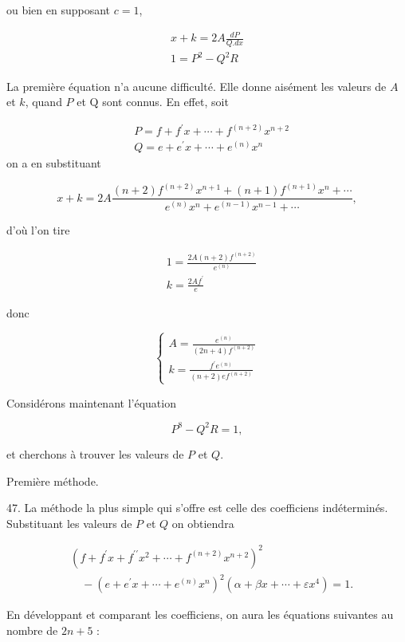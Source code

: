 \documentclass{article}
\begin{document}
ou bien en supposant \(c=1\),

\[
\begin{gathered}
x+k=2 A \frac{d P}{Q . d x} \\
1=P^{2}-Q^{2} R
\end{gathered}
\]

La première équation n'a aucune difficulté. Elle donne aisément les valeurs de \(A\) et \(k\), quand \(P\) et \(\mathrm{Q}\) sont connus. En effet, soit

\[
\begin{aligned}
& P=f+f^{\prime} x+\cdots+f^{(n+2)} x^{n+2} \\
& Q=e+e^{\prime} x+\cdots+e^{(n)} x^{n}
\end{aligned}
\]
on a en substituant

\[
x+k=2 A \frac{(n+2) f^{(n+2)} x^{n+1}+(n+1) f^{(n+1)} x^{n}+\cdots}{e^{(n)} x^{n}+e^{(n-1)} x^{n-1}+\cdots},
\]

d'où l'on tire

\[
\begin{aligned}
& 1=\frac{2 A(n+2) f^{(n+2)}}{e^{(n)}} \\
& k=\frac{2 A f^{\prime}}{e}
\end{aligned}
\]

donc

\[
\left\{\begin{array}{l}
A=\frac{e^{(n)}}{(2 n+4) f^{(n+2)}} \\
k=\frac{f^{\prime} e^{(n)}}{(n+2) e f^{(n+2)}}
\end{array}\right.
\]

Considérons maintenant l'équation

\[
P^{8}-Q^{2} R=1,
\]

et cherchons à trouver les valeurs de \(P\) et \(Q\).

Première méthode.

47. La méthode la plus simple qui s'offre est celle des coefficiens indéterminés. Substituant les valeurs de \(P\) et \(Q\) on obtiendra

\[
\begin{aligned}
& \left(f+f^{\prime} x+f^{\prime \prime} x^{2}+\cdots+f^{(n+2)} x^{n+2}\right)^{2} \\
& \quad-\left(e+e^{\prime} x+\cdots+e^{(n)} x^{n}\right)^{2}\left(\alpha+\beta x+\cdots+\varepsilon x^{4}\right)=1 .
\end{aligned}
\]

En développant et comparant les coefficiens, on aura les équations suivantes au nombre de \(2 n+5\) :
\end{document}
